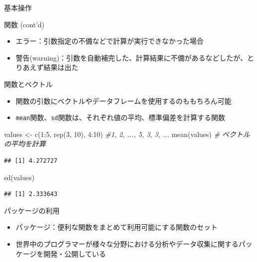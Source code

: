 \documentclass[
  ignorenonframetext,
]{beamer}
\newenvironment{Shaded}{\begin{snugshade}}{\end{snugshade}}
\newcommand{\CommentTok}[1]{\textcolor[rgb]{0.56,0.35,0.01}{\textit{#1}}}
\newcommand{\DecValTok}[1]{\textcolor[rgb]{0.00,0.00,0.81}{#1}}
\newcommand{\FunctionTok}[1]{\textcolor[rgb]{0.00,0.00,0.00}{#1}}
\newcommand{\NormalTok}[1]{#1}
\newcommand{\OtherTok}[1]{\textcolor[rgb]{0.56,0.35,0.01}{#1}}
\newcommand{\SpecialCharTok}[1]{\textcolor[rgb]{0.00,0.00,0.00}{#1}}
\providecommand{\tightlist}{%
  \setlength{\itemsep}{0pt}\setlength{\parskip}{0pt}}
\begin{document}
\begin{frame}[fragile]{基本操作}
\begin{block}{関数 (cont'd)}
\begin{itemize}
  \begin{itemize}
  \tightlist
  \item
    エラー：引数指定の不備などで計算が実行できなかった場合
  \item
    警告(warning)：引数を自動補完した、計算結果に不備があるなどしたが、とりあえず結果は出た
  \end{itemize}
\end{itemize}
\end{block}

\begin{block}{関数とベクトル}
\protect\hypertarget{ux95a2ux6570ux3068ux30d9ux30afux30c8ux30eb}{}
\begin{itemize}
\tightlist
\item
  関数の引数にベクトルやデータフレームを使用するのももちろん可能
\item
  \texttt{mean}関数、\texttt{sd}関数は、それぞれ値の平均、標準偏差を計算する関数
\end{itemize}

\begin{Shaded}
\begin{Highlighting}[]
\NormalTok{values }\OtherTok{\textless{}{-}} \FunctionTok{c}\NormalTok{(}\DecValTok{1}\SpecialCharTok{:}\DecValTok{5}\NormalTok{, }\FunctionTok{rep}\NormalTok{(}\DecValTok{3}\NormalTok{, }\DecValTok{10}\NormalTok{), }\DecValTok{4}\SpecialCharTok{:}\DecValTok{10}\NormalTok{) }\CommentTok{\#1, 2, ..., 5, 3, 3, ... }
\FunctionTok{mean}\NormalTok{(values) }\CommentTok{\# ベクトルの平均を計算}
\end{Highlighting}
\end{Shaded}

\begin{verbatim}
## [1] 4.272727
\end{verbatim}

\begin{Shaded}
\begin{Highlighting}[]
\FunctionTok{sd}\NormalTok{(values)}
\end{Highlighting}
\end{Shaded}

\begin{verbatim}
## [1] 2.333643
\end{verbatim}
\end{block}

\begin{block}{パッケージの利用}
\protect\hypertarget{ux30d1ux30c3ux30b1ux30fcux30b8ux306eux5229ux7528}{}
\begin{itemize}
\tightlist
\item
  パッケージ：便利な関数をまとめて利用可能にする関数のセット
\item
  世界中のプログラマーが様々な分野における分析やデータ収集に関するパッケージを開発・公開している


\end{itemize}
\end{block}
\end{frame}
\end{document}
